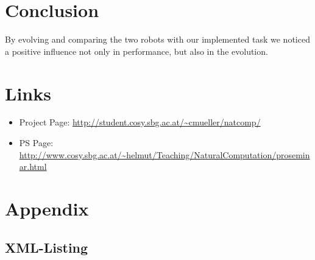 \documentclass[12pt,fleqn,a4paper]{article}
\begin{document}
\section{Conclusion}
By evolving and comparing the two robots with our implemented task we noticed a positive influence not only in performance, but also in the evolution.

\newpage
\section{Links}

\begin{itemize}
\item Project Page: \url{http://student.cosy.sbg.ac.at/~cmueller/natcomp/}
\item PS Page: \url{http://www.cosy.sbg.ac.at/~helmut/Teaching/NaturalComputation/proseminar.html}
\end{itemize}




\section{Appendix}

\subsection{XML-Listing}
\end{document}
